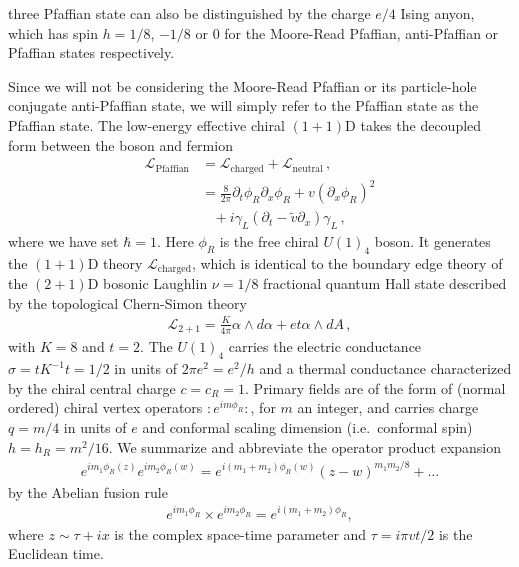 three Pfaffian \FQH state can also be distinguished by the charge $e/4$ Ising anyon, which has spin $h=1/8$, $-1/8$ or $0$ for the Moore-Read Pfaffian, anti-Pfaffian or \PHS Pfaffian states respectively. 

Since we will not be considering the Moore-Read Pfaffian or its particle-hole conjugate anti-Pfaffian state, we will simply refer to the \PHS Pfaffian state as the Pfaffian state. The low-energy effective chiral $(1+1)$D \CFT takes the decoupled form between the boson and fermion \begin{align}\mathcal{L}_{\mathrm{Pfaffian}}&=\mathcal{L}_{\mathrm{charged}}+\mathcal{L}_{\mathrm{neutral}} \,, \label{Pfaffian}\\&=\frac{8}{2\pi}\partial_t\phi_R\partial_x\phi_R+v(\partial_x\phi_R)^2\nonumber\\&\;\;\;+i\gamma_L(\partial_t-\tilde{v}\partial_x)\gamma_L\nonumber \,, \end{align} where we have set $\hbar=1$. Here $\phi_R$ is the free chiral $U(1)_4$ boson. It generates the $(1+1)$D theory $\mathcal{L}_{\mathrm{charged}}$, which is identical to the boundary edge theory of the $(2+1)$D bosonic Laughlin $\nu=1/8$ fractional quantum Hall state described by the topological Chern-Simon theory~\cite{WenZee92,Wenedgereview} \begin{align}\mathcal{L}_{2+1}=\frac{K}{4\pi}\alpha\wedge d\alpha+et\alpha\wedge dA \,, \label{LFQHCS}\end{align} with $K=8$ and $t=2$. The $U(1)_4$ \CFT carries the electric conductance $\sigma=tK^{-1}t=1/2$ in units of $2\pi e^2=e^2/h$ and a thermal conductance characterized by the chiral central charge $c=c_R=1$. Primary fields are of the form of (normal ordered) chiral vertex operators $:e^{im\phi_R}:$, for $m$ an integer, and carries charge $q=m/4$ in units of $e$ and conformal scaling dimension (i.e.~conformal spin) $h=h_R=m^2/16$. We summarize and abbreviate the operator product expansion \begin{align}e^{im_1\phi_R(z)}e^{im_2\phi_R(w)}=e^{i(m_1+m_2)\phi_R(w)}(z-w)^{m_1m_2/8}+\ldots\end{align} by the Abelian fusion rule \begin{align}e^{im_1\phi_R}\times e^{im_2\phi_R}=e^{i(m_1+m_2)\phi_R},\end{align} where $z\sim\tau+ix$ is the complex space-time parameter and $\tau=i\pi vt/2$ is the Euclidean time.


